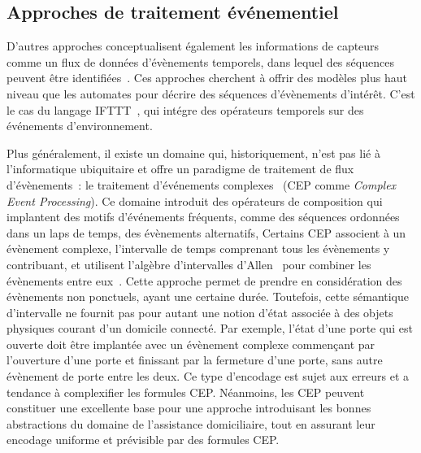 \subsection{Approches de traitement événementiel}\label{sec:cep}
D'autres approches conceptualisent également les informations de
capteurs comme un flux de données d'évènements temporels, dans lequel
des séquences peuvent être identifiées~\parencite{krishnan2014activity}. Ces
approches cherchent à offrir des modèles plus haut niveau que les
automates pour décrire des séquences d'évènements d'intérêt. C'est le
cas du langage IFTTT~\parencite{augusto2004the}, qui intégre des opérateurs
temporels sur des événements d'environnement.

Plus généralement, il existe un domaine qui, historiquement, n'est pas
lié à l'informatique ubiquitaire et offre un paradigme de traitement
de flux d'évènements~: le traitement d'événements
complexes~\parencite{cugola2012processing} (CEP comme {\it
  Complex Event Processing}). Ce domaine
introduit des opérateurs de composition qui implantent des motifs
d'événements fréquents, comme des séquences ordonnées dans un laps de
temps, des évènements alternatifs, \etc Certains CEP associent à un
évènement complexe, l'intervalle de temps comprenant tous les
évènements y contribuant, et utilisent l'algèbre d'intervalles d'Allen~\parencite{allen1983maintaining} pour combiner les évènements entre
eux~\parencite{anicic2010rule, li2011complex, helmer2016highlevel,
  hausmann2014language}.  Cette approche permet de prendre en
considération des évènements non ponctuels, ayant une certaine durée.
Toutefois, cette sémantique d'intervalle ne fournit pas pour autant
une notion d'état associée à des objets physiques courant d'un
domicile connecté.  Par exemple, l'état d'une porte qui est ouverte
doit être implantée avec un évènement complexe commençant par
l'ouverture d'une porte et finissant par la fermeture d'une porte,
sans autre évènement de porte entre les deux. Ce type d'encodage est
sujet aux erreurs et a tendance à complexifier les formules CEP.
Néanmoins, les CEP peuvent constituer une excellente base pour une approche
introduisant les bonnes abstractions du domaine de l'assistance domiciliaire, tout
en assurant leur encodage uniforme et prévisible par des formules CEP.

